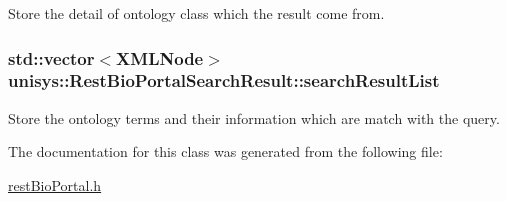 Store the detail of ontology class which the result come from. 

\hypertarget{classunisys_1_1RestBioPortalSearchResult_a82669936c321352e9ef89a347ac0b581}{
\subsubsection[{search\-Result\-List}]{\setlength{\rightskip}{0pt plus 5cm}std\-::vector$<${\bf X\-M\-L\-Node}$>$ unisys\-::\-Rest\-Bio\-Portal\-Search\-Result\-::search\-Result\-List\hspace{0.3cm}{\ttfamily [private]}}}\label{classunisys_1_1RestBioPortalSearchResult_a82669936c321352e9ef89a347ac0b581}


Store the ontology terms and their information which are match with the query. 



The documentation for this class was generated from the following file\-:\begin{DoxyCompactItemize}
\item 
\hyperlink{restBioPortal_8h}{rest\-Bio\-Portal.\-h}\end{DoxyCompactItemize}
